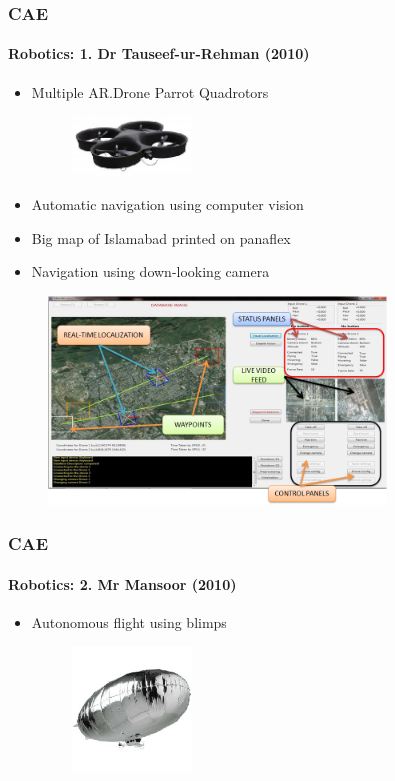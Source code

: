 \begin{frame}
\frametitle{CAE}
\framesubtitle{Robotics: 1. Dr Tauseef-ur-Rehman (2010)}
\mypagenum{}
\begin{itemize}\scriptsize
\item Multiple AR.Drone Parrot Quadrotors
\begin{figure}
\centering
\includegraphics[width=0.3\textwidth]{figs/quadcopter.png}
\end{figure}
\item Automatic navigation using computer vision
\item Big map of Islamabad printed on panaflex
\item Navigation using down-looking camera
\end{itemize}
\begin{figure}
\centering
\includegraphics[width=0.8\textwidth]{figs/temp_Quadrotor_GUI.png}
\end{figure}
\end{frame}


\begin{frame}
\frametitle{CAE}
\framesubtitle{Robotics: 2. Mr Mansoor (2010)}
\mypagenum{}
\begin{itemize}
\item Autonomous flight using blimps
\begin{figure}
\centering
\includegraphics[width=0.3\textwidth]{figs/blimp.png}
\end{figure}
\end{itemize}
\end{frame}




